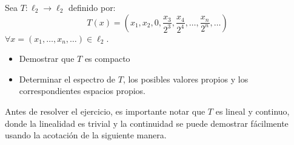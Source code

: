 \begin{ejercicio}
    Sea $T: \ell_2 \longrightarrow \ell_2$ definido por:
    \[ T(x) = \left( x_1, x_2, 0, \frac{x_3}{2^3}, \frac{x_4}{2^4}, \dots, \frac{x_n}{2^n}, \dots \right) \]
    $\forall x = (x_1, \dots, x_n, \dots) \in \ell_2$.
    \begin{itemize}
        \item[i)] Demostrar que $T$ es compacto
        \item[ii)] Determinar el espectro de $T$, los posibles valores propios y los correspondientes espacios propios.
    \end{itemize}
    Antes de resolver el ejercicio, es importante notar que $T$ es lineal y continuo, donde la linealidad es trivial y la continuidad se puede demostrar fácilmente usando la acotación de la siguiente manera. \\


\end{ejercicio}
